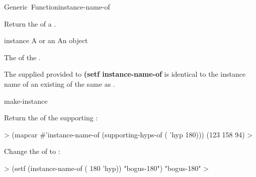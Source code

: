 \documentclass[10pt,twoside,english,pdftex]{article}
\begin{document}

\begin{functiondoc}{Generic~Function}{instance-name-of}{
    \returns{} }

\fnsyntax

\fnpurpose
Return the  of a .

\fnsetf
{}

\fnmethods
{}%
  {\code{(} 
  \returns{} }
%
  {\code{(} 
  \returns{} }

\fnpackage {}

\fnmodule {}

\fnargs
\begin{args}{instance}
\arg[instance] A  or an 
 An object
\end{args}

\fnreturns The  of the .

\fnerrors
%
The supplied  provided to \textbf{(setf instance-name-of}
is identical to the instance name of an existing  of the
same  as .

\begin{alsos}{make-instance}
\end{alsos}

\fnexamples
{}%
Return the  of the  supporting
  :
%
\W\supp
\begin{example}
  > (mapcar #'instance-name-of 
            (supporting-hyps-of ( 'hyp 180)))
  (123 158 94)
  >
\end{example}
%
%
%
Change the  of   to 
:
%
\W\supp\notpretop
\begin{example}
  > (setf (instance-name-of ( 180 'hyp)) "bogus-180")
  "bogus-180"
  >
\end{example}

\end{functiondoc}
\end{document}
